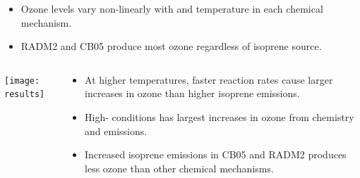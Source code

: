 \documentclass[center]{beamer}
\begin{document}
{\begin{frame}[plain]
\begin{columns}[onlypaperwidth]
\begin{column}{0.43\textwidth}
\begin{flushleft}
{\begin{itemize}
                            \item Ozone levels vary non-linearly with  and temperature in each chemical mechanism. \vspace{3mm}
                            \item RADM2 and CB05 produce most ozone regardless of isoprene source. %
                        \end{itemize} }
                \end{flushleft}
            \end{column}
        \end{columns}
    \end{frame}
}

{
    \begin{frame}[plain]
        \vspace{-3mm}
        \begin{columns}[onlypaperwidth]
            \begin{column}{0.75\textwidth}
                \begin{center}
                    \texttt{[image: results]} 
                \end{center}
            \end{column}%
            \begin{column}{0.43\textwidth} 
                \begin{flushleft}
                    \small{
                        \begin{itemize} 
                            \item At higher temperatures, faster reaction rates cause larger increases in ozone than higher isoprene emissions. \vspace{3mm}
                            \item High- conditions has largest increases in ozone from chemistry and emissions. \vspace{3mm}
                            \item Increased isoprene emissions in CB05 and RADM2 produces less ozone than other chemical mechanisms. %
                        \end{itemize} }
                \end{flushleft}
            \end{column}
        \end{columns}
    \end{frame}
}
\end{document}
